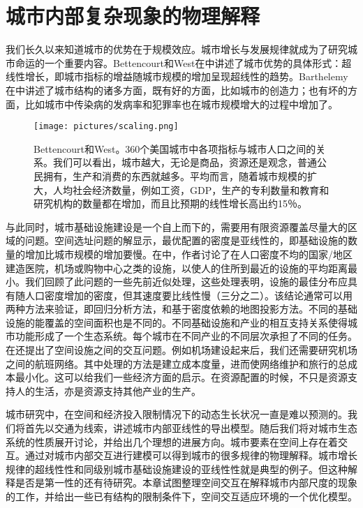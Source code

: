 \chapter{城市内部复杂现象的物理解释}

我们长久以来知道城市的优势在于规模效应。城市增长与发展规律就成为了研究城市命运的一个重要内容\cite{thisse2010toward}。Bettencourt和West在\cite{bettencourt2010unified}中讲述了城市优势的具体形式：超线性增长，即城市指标的增益随城市规模的增加呈现超线性的趋势。Barthelemy在\cite{Barthelemy2019}中讲述了城市结构的诸多方面，既有好的方面，比如城市的创造力\cite{Arbesman2009}；也有坏的方面，比如城市中传染病的发病率\cite{PhysRevE.94.052316}和犯罪率\cite{banerjee2015competitive}也在城市规模增大的过程中增加了。

\begin{figure}
  \centering
  \texttt{[image: pictures/scaling.png]}
  \caption{Bettencourt和West\cite{bettencourt2010unified}。360个美国城市中各项指标与城市人口之间的关系。我们可以看出，城市越大，无论是商品，资源还是观念，普通公民拥有，生产和消费的东西就越多。平均而言，随着城市规模的扩大，人均社会经济数量，例如工资，GDP，生产的专利数量和教育和研究机构的数量都在增加，而且比预期的线性增长高出约15％。}
\end{figure}

与此同时，城市基础设施建设是一个自上而下的，需要用有限资源覆盖尽量大的区域的问题\cite{PhysRevE.90.022803,PhysRevE.74.016117}。空间选址问题的解显示，最优配置的密度是亚线性的，即基础设施的数量的增加比城市规模的增加要慢。在\cite{PhysRevE.74.016117}中，作者讨论了在人口密度不均的国家/地区建造医院，机场或购物中心之类的设施，以使人的住所到最近的设施的平均距离最小。我们回顾了此问题的一些先前近似处理，这些处理表明，设施的最佳分布应具有随人口密度增加的密度，但其速度要比线性慢（三分之二）。该结论通常可以用两种方法来验证，即回归分析方法，和基于密度依赖的地图投影方法。不同的基础设施的能覆盖的空间面积也是不同的。不同基础设施和产业的相互支持关系使得城市功能形成了一个生态系统。每个城市在不同产业的不同层次承担了不同的任务\cite{camagni1993city,christopherson1986city}。在\cite{PhysRevE.74.016117}还提出了空间设施之间的交互问题。例如机场建设起来后，我们还需要研究机场之间的航班网络。其中处理的方法是建立成本度量，进而使网络维护和旅行的总成本最小化。这可以给我们一些经济方面的启示。在资源配置的时候，不只是资源支持人的生活，亦是资源支持其他产业的生产。

城市研究中，在空间和经济投入限制情况下的动态生长状况一直是难以预测的。我们将首先以交通为线索，讲述城市内部亚线性的导出模型。随后我们将对城市生态系统的性质展开讨论，并给出几个理想的进展方向。城市要素在空间上存在着交互。通过对城市内部交互进行建模可以得到城市的很多规律的物理解释。城市增长规律的超线性性和同级别城市基础设施建设的亚线性性就是典型的例子。但这种解释是否是第一性的还有待研究。本章试图整理空间交互在解释城市内部尺度的现象的工作，并给出一些已有结构的限制条件下，空间交互适应环境的一个优化模型。

